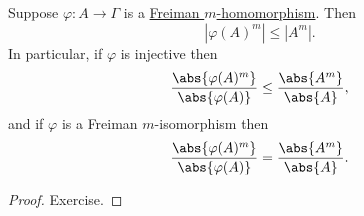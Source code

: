\documentclass{article}
\newcommand{\ratio}[2]{\frac{\abs{#1}}{\abs{#2}}}
\numberwithin{equation}{section}
\begin{document}
\begin{nlemma}\label{lem:4.7}
  Suppose $\varphi: A \to \Gamma$ is a \hyperlink{def:fhom}{Freiman $m$-homomorphism}.
  Then
  \begin{equation*}|\varphi(A)^m| \leq |A^m|.\end{equation*}
  In particular, if $\varphi$ is injective then
  \begin{equation*}\ratio{\varphi(A)^m}{\varphi(A)} \leq \ratio{A^m}{A},\end{equation*}
  and if $\varphi$ is a Freiman $m$-isomorphism then
  \begin{equation*}\ratio{\varphi(A)^m}{\varphi(A)} = \ratio{A^m}{A}.\end{equation*}
\end{nlemma}
\begin{proof}
  Exercise.
\end{proof}
\printindex
\end{document}
